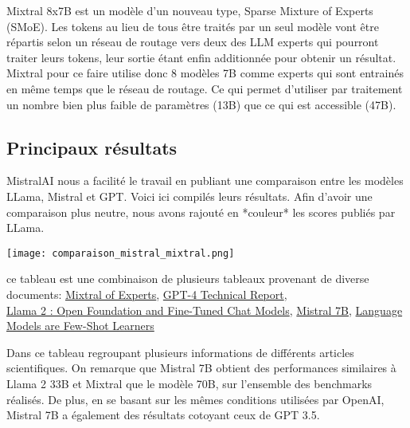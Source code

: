 \documentclass[11pt]{rapport_class}
\begin{document}
\qquad Mixtral 8x7B est un modèle d’un nouveau type, Sparse Mixture of Experts (SMoE). Les tokens au lieu de tous être traités par un seul modèle vont être répartis selon un réseau de routage vers deux des LLM experts qui pourront traiter leurs tokens, leur sortie étant enfin additionnée pour obtenir un résultat. Mixtral pour ce faire utilise donc 8 modèles 7B comme experts qui sont entrainés en même temps que le réseau de routage. Ce qui permet d’utiliser par traitement un nombre bien plus faible de paramètres (13B) que ce qui est accessible (47B).

\vspace{12cm}

\subsection{Principaux résultats}
\qquad MistralAI nous a facilité le travail en publiant une comparaison entre les modèles LLama, Mistral et GPT. Voici ici compilés leurs résultats. Afin d'avoir une comparaison plus neutre, nous avons rajouté en *couleur* les scores publiés par LLama.


\begin{center}
    \texttt{[image: comparaison\_mistral\_mixtral.png]}\\
    \begin{tiny}
         ce tableau est une combinaison de plusieurs tableaux provenant de diverse documents: \href{https://arxiv.org/pdf/2401.04088v1.pdf}{Mixtral of Experts}, \href{https://arxiv.org/pdf/2303.08774v4.pdf}{GPT-4 Technical Report},\\
         \href{https://arxiv.org/pdf/2307.09288v2.pdf}{Llama 2 : Open Foundation and Fine-Tuned Chat Models},
         \href{https://arxiv.org/pdf/2310.06825v1.pdf}{Mistral 7B},
         \href{https://arxiv.org/pdf/2005.14165v4.pdf}{Language Models are Few-Shot Learners}
         \\
    \end{tiny} 
\end{center}

\vspace{0mm}
\qquad Dans ce tableau regroupant plusieurs informations de différents articles scientifiques. On remarque que Mistral 7B obtient des performances similaires à Llama 2 33B et Mixtral que le modèle 70B, sur l’ensemble des benchmarks réalisés. De plus, en se basant sur les mêmes conditions utilisées par OpenAI, Mistral 7B a également des résultats cotoyant ceux de GPT 3.5.
\end{document}
